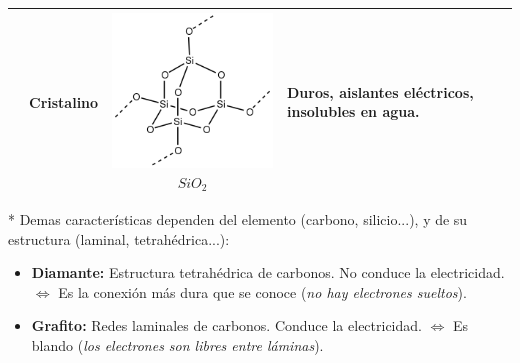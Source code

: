 \documentclass{book}
\begin{document}
\begin{tabular}{| c || m{2cm} | c m{8cm} |}
                           & Cristalino  & \includegraphics[scale=0.15]{dioxido de silicio.png} \textit{$ SiO_{2} $} & Duros, aislantes eléctricos, insolubles en agua.  \\ [2 ex]
  \hline
\end{tabular}
* Demas características dependen del elemento (carbono, silicio...), y de su estructura (laminal, tetrahédrica...):

\begin{itemize}
  \item \textbf{Diamante:} Estructura tetrahédrica de carbonos. No conduce la electricidad. $ \iff $ Es la conexión más dura que se conoce (\textit{no hay electrones sueltos}).
  \item \textbf{Grafito:} Redes laminales de carbonos. Conduce la electricidad. $ \iff $ Es blando (\textit{los electrones son libres entre láminas}).
\end{itemize}
\end{document}
